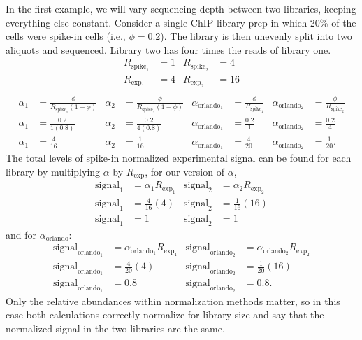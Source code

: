 In the first example, we will vary sequencing depth between two libraries, keeping everything else constant.
Consider a single ChIP library prep in which 20\% of the cells were spike-in cells (i.e., $\phi=0.2$).
The library is then unevenly split into two aliquots and sequenced.
Library two has four times the reads of library one.
\begin{align*}
    R_{\text{spike}_1} &= 1 & R_{\text{spike}_2} &= 4 \\
    R_{\text{exp}_1} &= 4 & R_{\text{exp}_2} &= 16 \\
\end{align*}
\begin{align*}
    \alpha_1 &= \frac{\phi}{R_{\text{spike}_1} \left(1-\phi \right)} &
    \alpha_2 &= \frac{\phi}{R_{\text{spike}_2} \left(1-\phi \right)} &
    \alpha_{\text{orlando}_1} &= \frac{\phi}{R_{\text{spike}_1}} &
    \alpha_{\text{orlando}_2} &= \frac{\phi}{R_{\text{spike}_2}} \\
    \alpha_1 &= \frac{0.2}{1 \left(0.8 \right)} &
    \alpha_2 &= \frac{0.2}{4 \left(0.8 \right)} &
    \alpha_{\text{orlando}_1} &= \frac{0.2}{1} &
    \alpha_{\text{orlando}_2} &= \frac{0.2}{4} \\
    \alpha_1 &= \frac{4}{16} &
    \alpha_2 &= \frac{1}{16} &
    \alpha_{\text{orlando}_1} &= \frac{4}{20} &
    \alpha_{\text{orlando}_2} &= \frac{1}{20}.
\end{align*}
The total levels of spike-in normalized experimental signal can be found for each library by multiplying $\alpha$ by $R_\text{exp}$, for our version of $\alpha$,
\begin{align*}
    \text{signal}_1 &= \alpha_1 R_{\text{exp}_1}  &
    \text{signal}_2 &= \alpha_2 R_{\text{exp}_2}  \\
    \text{signal}_1 &=  \frac{4}{16} \left(4 \right)  &
    \text{signal}_2 &=  \frac{1}{16} \left(16 \right)  \\
    \text{signal}_1 &=  1 &
    \text{signal}_2 &=  1
\end{align*}
and for $\alpha_\text{orlando}$:
\begin{align*}
    \text{signal}_{\text{orlando}_1} &= \alpha_{\text{orlando}_1} R_{\text{exp}_1} &
    \text{signal}_{\text{orlando}_2} &= \alpha_{\text{orlando}_2} R_{\text{exp}_2} \\
    \text{signal}_{\text{orlando}_1} &= \frac{4}{20} \left(4\right) &
    \text{signal}_{\text{orlando}_2} &= \frac{1}{20} \left(16\right) \\
    \text{signal}_{\text{orlando}_1} &= 0.8 &
    \text{signal}_{\text{orlando}_2} &= 0.8.
\end{align*}
Only the relative abundances within normalization methods matter, so in this case both calculations correctly normalize for library size and say that the normalized signal in the two libraries are the same.

